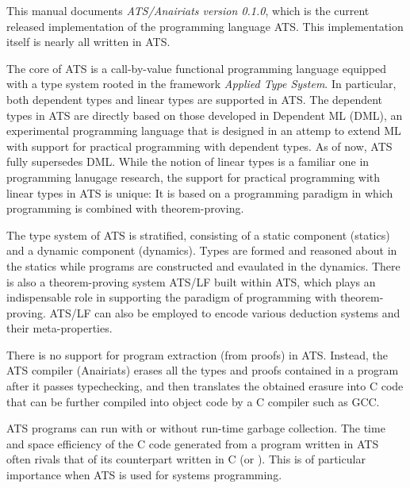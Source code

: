 This manual documents {\em ATS/Anairiats version 0.1.0}, which is the
current released implementation of the programming language ATS. This
implementation itself is nearly all written in ATS.

The core of ATS is a call-by-value functional programming language equipped
with a type system rooted in the framework {\em Applied Type System}. In
particular, both dependent types and linear types are supported in ATS. The
dependent types in ATS are directly based on those developed in Dependent
ML (DML), an experimental programming language that is designed in an
attemp to extend ML with support for practical programming with dependent
types. As of now, ATS fully supersedes DML. While the notion of linear
types is a familiar one in programming lanugage research, the support for
practical programming with linear types in ATS is unique: It is based on a
programming paradigm in which programming is combined with theorem-proving.

The type system of ATS is stratified, consisting of a static component
(statics) and a dynamic component (dynamics). Types are formed and reasoned
about in the statics while programs are constructed and evaulated in the
dynamics. There is also a theorem-proving system ATS/LF built within ATS,
which plays an indispensable role in supporting the paradigm of programming
with theorem-proving. ATS/LF can also be employed to encode various
deduction systems and their meta-properties.

There is no support for program extraction (from proofs) in ATS. Instead,
the ATS compiler (Anairiats) erases all the types and proofs contained in a
program after it passes typechecking, and then translates the obtained
erasure into C code that can be further compiled into object code by a C
compiler such as GCC.

ATS programs can run with or without run-time garbage collection. The time
and space efficiency of the C code generated from a program written in ATS
often rivals that of its counterpart written in C (or \cplusplus). This is of
particular importance when ATS is used for systems programming.

